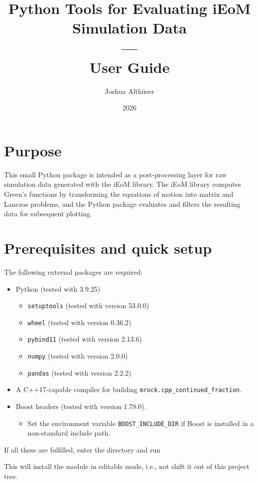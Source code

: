\documentclass[11pt]{article}
\title{Python Tools for Evaluating iEoM Simulation Data \\ --- \\ User Guide}
\author{Joshua Althüser}
\date{2026}
\newcommand{\code}[1]{%
  \texttt{\detokenize{#1}}%
}
\begin{document}
\maketitle

\section{Purpose}

This small Python package is intended as a post-processing layer for raw simulation data generated with the iEoM library. 
The iEoM library computes Green's functions by transforming the equations of motion into matrix and Lanczos problems, and the Python package evaluates and filters the resulting data for subsequent plotting.

\section{Prerequisites and quick setup}

The following external packages are required:
\begin{itemize}
  \item Python (tested with 3.9.25)
  \begin{itemize}
      \item \texttt{setuptools} (tested with version 53.0.0)
      \item \texttt{wheel} (tested with version 0.36.2)
      \item \texttt{pybind11} (tested with version 2.13.6)
      \item \texttt{numpy} (tested with version 2.0.0)
      \item \texttt{pandas} (tested with version 2.2.2)
  \end{itemize}
  \item A C++17-capable compiler for building \texttt{mrock.cpp\_continued\_fraction}. 
  \item Boost headers (tested with version 1.78.0).
  \begin{itemize}
      \item Set the environment variable \texttt{BOOST\_INCLUDE\_DIR} if Boost is installed in a non-standard include path.
  \end{itemize}
\end{itemize}

If all these are fulfilled, enter the \code{python} directory and run \code{pip install -e .}

This will install the module in editable mode, i.e., not shift it out of this project tree.
\end{document}
